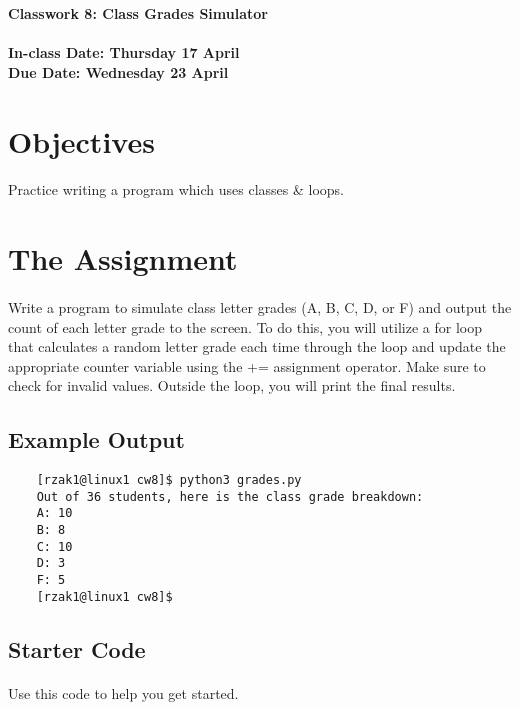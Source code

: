 \documentclass[letter,10pt]{article}
\begin{document}
    
    \huge
    \textbf{Classwork 8: Class Grades Simulator}
    \normalsize
    \\ ~~ \\
    \textbf{In-class Date: Thursday 17 April} \\
    \textbf{Due Date: Wednesday 23 April}
    
    \section*{Objectives}
    \paragraph{}Practice writing a program which uses classes \& loops.
    
    \section*{The Assignment}
    \paragraph{}Write a program to simulate class letter grades (A, B, C, D, or F) and output the count of each letter grade to the screen. To do this, you will utilize a for loop that calculates a random letter grade each time through the loop and update the appropriate counter variable using the += assignment operator. Make sure to check for invalid values. Outside the loop, you will print the final results.
    
    \subsection*{Example Output}
    \begin{verbatim}
    [rzak1@linux1 cw8]$ python3 grades.py
    Out of 36 students, here is the class grade breakdown:
    A: 10
    B: 8
    C: 10
    D: 3
    F: 5
    [rzak1@linux1 cw8]$ 
    \end{verbatim}
    
    \subsection*{Starter Code}
    \paragraph{}Use this code to help you get started.
    
\end{document}
